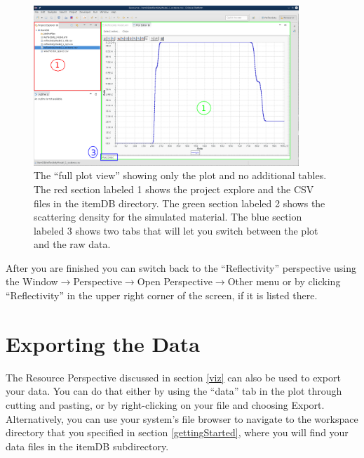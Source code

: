 \begin{figure}[!h]
\centering
\includegraphics[width=10cm]{images/fullPlotView_coated.png}
\caption{The ``full plot view'' showing only the plot and no additional tables.
The red section labeled 1 shows the project explore and the CSV files in the
itemDB directory. The green section labeled 2 shows the scattering density for
the simulated material. The blue section labeled 3 shows two tabs that will let
you switch between the plot and the raw data.}
\label{fullPlotView}
\end{figure}

After you are finished you can switch back to the ``Reflectivity'' perspective
using the Window$\rightarrow$Perspective$\rightarrow$Open
Perspective$\rightarrow$Other menu or by clicking ``Reflectivity'' in the upper
right corner of the screen, if it is listed there.

\section{Exporting the Data}
\label{export}

The Resource Perspective discussed in section \ref{viz} can also be used to
export your data. You can do that either by using the ``data'' tab in the plot
through cutting and pasting, or by right-clicking on your file and choosing
Export. Alternatively, you can use your system's file browser to navigate to the
workspace directory that you specified in section \ref{gettingStarted}, where
you will find your data files in the itemDB subdirectory.
